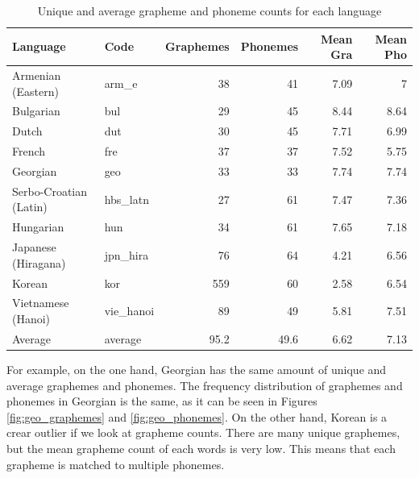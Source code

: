 \documentclass[11pt,a4paper]{article}
\begin{document}
\begin{table}[ht]
\centering
\begin{tabular}{llrrrr}
\toprule
               Language &       Code & Graphemes & Phonemes & Mean Gra & Mean Pho \\
\midrule
     Armenian (Eastern) &      arm\_e &               38 &              41 &              7.09 &                7 \\
              Bulgarian &        bul &               29 &              45 &              8.44 &             8.64 \\
                  Dutch &        dut &               30 &              45 &              7.71 &             6.99 \\
                 French &        fre &               37 &              37 &              7.52 &             5.75 \\
               Georgian &        geo &               33 &              33 &              7.74 &             7.74 \\
 Serbo-Croatian (Latin) &   hbs\_latn &               27 &              61 &              7.47 &             7.36 \\
              Hungarian &        hun &               34 &              61 &              7.65 &             7.18 \\
    Japanese (Hiragana) &   jpn\_hira &               76 &              64 &              4.21 &             6.56 \\
                 Korean &        kor &              559 &              60 &              2.58 &             6.54 \\
     Vietnamese (Hanoi) &  vie\_hanoi &               89 &              49 &              5.81 &             7.51 \\
\midrule
                Average &    average &             95.2 &            49.6 &              6.62 &             7.13 \\
\bottomrule
\end{tabular}
\caption{Unique and average grapheme and phoneme counts for each language}
\label{tab:counts}
\end{table}

For example, on the one hand, Georgian has the same amount of unique and average graphemes and phonemes. The frequency distribution of graphemes and phonemes in Georgian is the same, as it can be seen in Figures \ref{fig:geo_graphemes} and \ref{fig:geo_phonemes}. On the other hand, Korean is a crear outlier if we look at grapheme counts. There are many unique graphemes, but the mean grapheme count of each words is very low. This means that each grapheme is matched to multiple phonemes.
\end{document}
